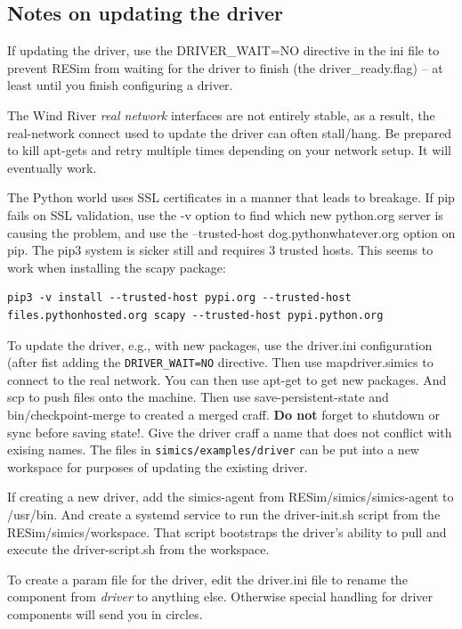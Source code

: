 \documentclass[titlepage]{article}
\begin{document}
\begin{appendices}
\subsection{Notes on updating the driver}
If updating the driver, use the DRIVER\_WAIT=NO directive in the ini file to prevent RESim from waiting for the driver to finish 
(the driver\_ready.flag) -- at least until you finish configuring a driver.

The Wind River \textit{real network} interfaces are not entirely stable, as a result, the real-network connect used to update the driver can often stall/hang.
Be prepared to kill apt-gets and retry multiple times depending on your network setup.  It will eventually work.

The Python world uses SSL certificates in a manner that leads to breakage.  If pip fails on SSL validation, use the -v option
to find which new python.org server is causing the problem, and use the --trusted-host dog.pythonwhatever.org option on pip.
The pip3 system is sicker still and requires 3 trusted hosts.  This seems to work when installing the scapy package:
\begin{verbatim}
pip3 -v install --trusted-host pypi.org --trusted-host files.pythonhosted.org scapy --trusted-host pypi.python.org
\end{verbatim}

To update the driver, e.g., with new packages, use the driver.ini configuration (after fist adding the {\tt DRIVER\_WAIT=NO} directive.  Then use mapdriver.simics to connect to the real network.
You can then use apt-get to get new packages.  And scp to push files onto the machine.  Then use save-persistent-state and bin/checkpoint-merge to
created a merged craff.  \textbf{Do not} forget to shutdown or sync before saving state!.  Give the driver craff a name that does not conflict with exising names.
The files in {\tt simics/examples/driver} can be put into a new workspace for purposes of updating the existing driver.

If creating a new driver, add the simics-agent from RESim/simics/simics-agent to /usr/bin.  And create a systemd service to run the
driver-init.sh script from the RESim/simics/workspace.  That script bootstraps the driver's ability to pull
and execute the driver-script.sh from the workspace.

To create a param file for the driver, edit the driver.ini file to rename the component from \textit{driver} to anything else.  Otherwise special handling for
driver components will send you in circles.


\end{appendices}
\end{document}
